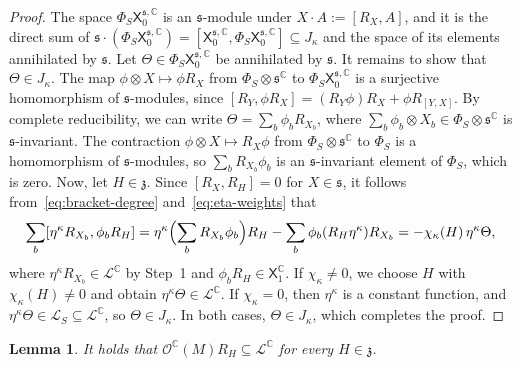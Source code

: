 \documentclass{article}
\newcommand{\C}{\mathbb{C}}
\newcommand{\fraks}{\mathfrak{s}}
\newcommand{\frakz}{\mathfrak{z}}
\newcommand{\sX}{\mathsf{X}}
\newcommand{\Ocal}{\mathcal{O}}
\newcommand{\cL}{\mathcal{L}}
\newtheorem{lemma}{Lemma}
\theoremstyle{definition}
\theoremstyle{plain}
\begin{document}
\begin{proof}
The space $\Phi_S\sX_0^{\fraks,\C}$ is an $\fraks$-module under $X\cdot A:=[R_X,A]$, and it is the direct sum of $\fraks\cdot(\Phi_S\sX_0^{\fraks,\C})=[\sX_0^{\fraks,\C},\Phi_S\sX_0^{\fraks,\C}]\subseteq J_\kappa$ and the space of its elements annihilated by $\fraks$.
Let $\Theta\in\Phi_S\sX_0^{\fraks,\C}$ be annihilated by $\fraks$. It remains to show that $\Theta\in J_\kappa$.
The map $\phi\otimes X\mapsto\phi R_X$ from $\Phi_S\otimes\fraks^\C$ to $\Phi_S\sX_0^{\fraks,\C}$ is a surjective homomorphism of $\fraks$-modules, since $[R_Y,\phi R_X]=(R_Y\phi)R_X+\phi R_{[Y,X]}$.
By complete reducibility, we can write $\Theta=\sum_b\phi_bR_{X_b}$, where $\sum_b\phi_b\otimes X_b\in\Phi_S\otimes\fraks^\C$ is $\fraks$-invariant.
The contraction $\phi\otimes X\mapsto R_X\phi$ from $\Phi_S\otimes\fraks^\C$ to $\Phi_S$ is a homomorphism of $\fraks$-modules, so $\sum_bR_{X_b}\phi_b$ is an $\fraks$-invariant element of $\Phi_S$, which is zero.
Now, let $H\in\frakz$. Since $[R_X,R_H]=0$ for $X\in\fraks$, it follows from~\eqref{eq:bracket-degree} and~\eqref{eq:eta-weights} that
$$
    \sum_b[\eta^\kappa R_{X_b},\phi_bR_H]
    =\eta^\kappa\Bigl(\sum_bR_{X_b}\phi_b\Bigr)R_H-\sum_b\phi_b(R_H\eta^\kappa)R_{X_b}
    =-\chi_\kappa(H)\,\eta^\kappa\Theta,
$$
where $\eta^\kappa R_{X_b}\in\cL^\C$ by Step~1 and $\phi_bR_H\in\sX_1^\C$.
If $\chi_\kappa\neq0$, we choose $H$ with $\chi_\kappa(H)\neq0$ and obtain $\eta^\kappa\Theta\in\cL^\C$.
If $\chi_\kappa=0$, then $\eta^\kappa$ is a constant function, and $\eta^\kappa\Theta\in\cL_S\subseteq\cL^\C$, so $\Theta\in J_\kappa$.
In both cases, $\Theta\in J_\kappa$, which completes the proof.
\end{proof}

\begin{lemma}\label{lem:central-part}
It holds that $\Ocal^\C(M)R_H\subseteq\cL^\C$ for every $H\in\frakz$.
\end{lemma}
\end{document}
